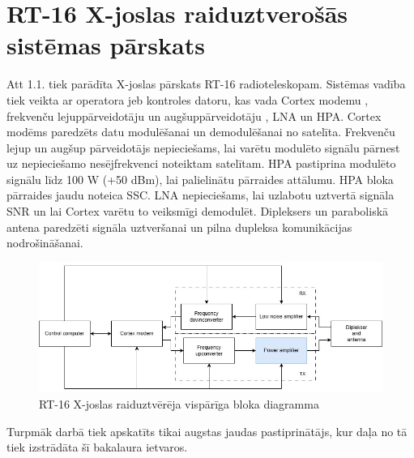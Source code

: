 \section{RT-16 X-joslas raiduztverošās sistēmas pārskats}
Att 1.1. tiek parādīta X-joslas pārskats RT-16 radioteleskopam. Sistēmas vadība tiek veikta ar operatora jeb kontroles datoru, kas vada Cortex modemu \cite{cortex}, frekvenču lejuppārveidotāju un augšuppārveidotāju \cite{up_down_converters}, LNA un HPA. Cortex modēms paredzēts datu modulēšanai un demodulēšanai no satelīta. Frekvenču lejup un augšup pārveidotājs nepieciešams, lai varētu modulēto signālu pārnest uz nepieciešamo nesējfrekvenci noteiktam satelītam. HPA pastiprina modulēto signālu līdz 100 W (+50 dBm), lai palielinātu pārraides attālumu. HPA bloka pārraides jaudu noteica SSC. LNA nepieciešams, lai uzlabotu uztvertā signāla SNR un lai Cortex varētu to veiksmīgi demodulēt. Dipleksers un paraboliskā antena paredzēti signāla uztveršanai un pilna dupleksa komunikācijas nodrošināšanai.
\begin{figure}[H]
	\centering
    \includegraphics[width=\textwidth]{pictures/rt-16_x_diagram.jpg}\hspace{1cm}
    \caption{RT-16 X-joslas raiduztvērēja vispārīga bloka diagramma}
\end{figure}
Turpmāk darbā tiek apskatīts tikai augstas jaudas pastiprinātājs, kur daļa no tā tiek izstrādāta šī bakalaura ietvaros.